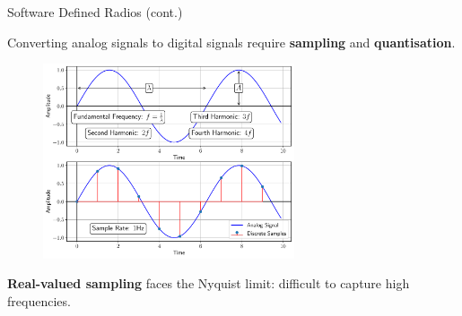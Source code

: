 \documentclass[handout]{beamer}
\begin{document}
\begin{frame}{Software Defined Radios (cont.)}  

	\footnotesize
	Converting analog signals to digital signals require \textbf{sampling} and \textbf{quantisation}. 

	\begin{figure}
		\includegraphics[width=210pt]{figures/signal-properties.pdf}
	\end{figure}

	\footnotesize
	\textbf{Real-valued sampling} faces the Nyquist limit: difficult to capture high frequencies.

\end{frame}
\end{document}
